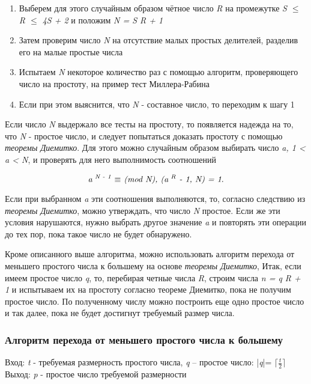     \begin{enumerate}
     \item Выберем для этого случайным образом чётное число \textit{R} на промежутке \textit{S {$\le$} R {$\le$} 4S + 2} и положим \textit{N = S R + 1} 
     \item Затем проверим число \textit{N} на отсутствие малых простых делителей, разделив его на малые простые числа
     \item Испытаем \textit{N} некоторое количество раз с помощью алгоритм, проверяющего число на простоту, на пример тест Миллера-Рабина 
     \item Если при этом выяснится, что \textit{N} - составное число, то переходим к шагу 1 
    \end{enumerate}

Если число \textit{N} выдержало все тесты на простоту, то появляется надежда на то, что \textit{N} - простое число, и следует попытаться 
доказать простоту с помощью \textit{теоремы Диемитко}. Для этого можно случайным образом выбирать число \textit{a, 1 < a < N},
и проверять для него выполнимость соотношений

  \begin{equation}
    \textit{a\textsuperscript{ N - 1} {$\equiv$} (mod N), (a\textsuperscript{ R} - 1, N) = 1}.
  \end{equation}
  
  Если при выбранном \textit{a} эти соотношения выполняются, то, согласно следствию из \textit{теоремы Диемитко}, можно 
утверждать, что число \textit{N} простое. Если же эти условия нарушаются, нужно выбрать другое значение \textit{a} и повторять 
эти операции до тех пор, пока такое число не будет обнаружено.

  Кроме описанного выше алгоритма, можно использовать алгоритм перехода от меньшего простого числа к большему на основе \textit{теоремы Диемитко},
  Итак, если имеем простое число \textit{q}, то, перебирая четные числа \textit{R}, строим числа \textit{n = q R + 1} и испытываем их на 
  простоту согласно теореме Диемитко, пока не получим простое число. По полученному числу можно построить еще одно простое число и так далее,
  пока не будет достигнут требуемый размер числа.
  
  \subsubsection{Алгоритм перехода от меньшего простого числа к большему}
    Вход: \textit{t} - требуемая размерность простого числа, \textit{q} – простое число: |\textit{q}|= \textit{{$\lceil \frac{t}{2} \rceil$}}
    Выход: \textit{p} - простое число требуемой размерности
    
